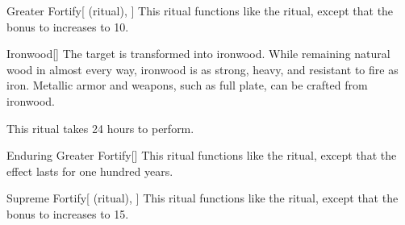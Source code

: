 \lowercase{\hypertarget{spell:Greater Fortify}{}}\label{spell:Greater Fortify}
\begin{attuneability}[Rank 4]{\hypertarget{spell:Greater Fortify}{Greater Fortify}}[ (ritual), ]
This ritual functions like the  ritual, except that the bonus to  increases to 10.
\end{attuneability}
\vspace{0.25em}



\lowercase{\hypertarget{spell:Ironwood}{}}\label{spell:Ironwood}
\begin{apability}[Rank 4]{\hypertarget{spell:Ironwood}{Ironwood}}[]
The target is transformed into ironwood.
While remaining natural wood in almost every way, ironwood is as strong, heavy, and resistant to fire as iron.
Metallic armor and weapons, such as full plate, can be crafted from ironwood.

This ritual takes 24 hours to perform.
\end{apability}
\vspace{0.25em}



\lowercase{\hypertarget{spell:Enduring Greater Fortify}{}}\label{spell:Enduring Greater Fortify}
\begin{apability}[Rank 5]{\hypertarget{spell:Enduring Greater Fortify}{Enduring Greater Fortify}}[]
This ritual functions like the  ritual, except that the effect lasts for one hundred years.
\end{apability}
\vspace{0.25em}



\lowercase{\hypertarget{spell:Supreme Fortify}{}}\label{spell:Supreme Fortify}
\begin{attuneability}[Rank 7]{\hypertarget{spell:Supreme Fortify}{Supreme Fortify}}[ (ritual), ]
This ritual functions like the  ritual, except that the bonus to  increases to 15.
\end{attuneability}
\vspace{0.25em}


